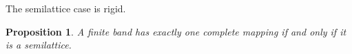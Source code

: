 \documentclass[11pt]{article}
\theoremstyle{plain}
\newtheorem{prop}[theorem]{Proposition}
\theoremstyle{remark}
\theoremstyle{definition}
\theoremstyle{plain}
\begin{document}
The semilattice case is rigid.

%

\begin{prop}\label{p:unique}
    A finite band has exactly one complete mapping if and only if it is a
    semilattice.
\end{prop}
\end{document}
